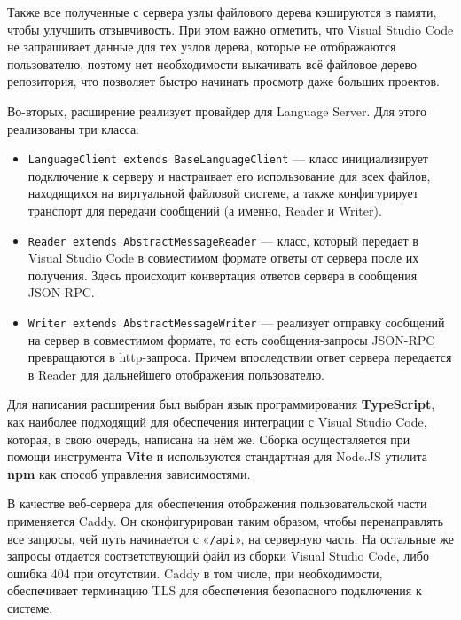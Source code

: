 Также все полученные с сервера узлы файлового дерева кэшируются в памяти, чтобы улучшить отзывчивость. При этом важно отметить, что Visual Studio Code не запрашивает данные для тех узлов дерева, которые не отображаются пользователю, поэтому нет необходимости выкачивать всё файловое дерево репозитория, что позволяет быстро начинать просмотр даже больших проектов.

Во-вторых, расширение реализует провайдер для Language Server. Для этого реализованы три класса:
\begin{itemize}
    \item \texttt{LanguageClient extends BaseLanguageClient} — класс инициализирует подключение к серверу и настраивает его использование для всех файлов, находящихся на виртуальной файловой системе, а также конфигурирует транспорт для передачи сообщений (а именно, Reader и Writer).
    \item \texttt{Reader extends AbstractMessageReader} — класс, который передает в Visual Studio Code в совместимом формате ответы от сервера после их получения. Здесь происходит конвертация ответов сервера в сообщения JSON-RPC.
    \item \texttt{Writer extends AbstractMessageWriter} — реализует отправку сообщений на сервер в совместимом формате, то есть сообщения-запросы JSON-RPC превращаются в http-запроса. Причем впоследствии ответ сервера передается в Reader для дальнейшего отображения пользователю.
\end{itemize}

Для написания расширения был выбран язык программирования \textbf{TypeScript}, как наиболее подходящий для обеспечения интеграции с Visual Studio Code, которая, в свою очередь, написана на нём же. Сборка осуществляется при помощи инструмента \textbf{Vite} и используются стандартная для Node.JS утилита \textbf{npm} как способ управления зависимостями.

В качестве веб-сервера для обеспечения отображения пользовательской части применяется Caddy. Он сконфигурирован таким образом, чтобы перенаправлять все запросы, чей путь начинается с «\texttt{/api}», на серверную часть. На остальные же запросы отдается соответствующий файл из сборки Visual Studio Code, либо ошибка 404 при отсутствии. Caddy в том числе, при необходимости, обеспечивает терминацию TLS для обеспечения безопасного подключения к системе.

